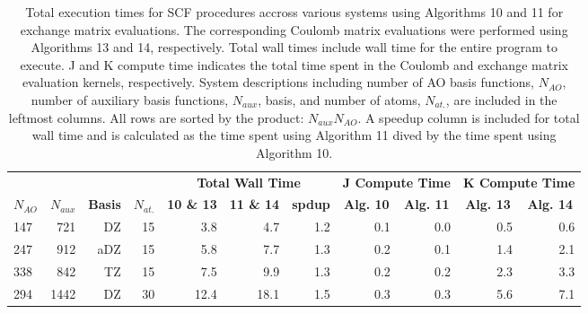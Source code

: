 \begingroup
\renewcommand{\arraystretch}{0.7}
\begin{table}[H]
\footnotesize
\centering
\renewcommand{\baselinestretch}{1}
\caption{Total execution times for SCF procedures accross various systems using Algorithms 10 and 11 for exchange matrix evaluations. 
The corresponding Coulomb matrix evaluations were performed using Algorithms 13 and 14, respectively. Total wall times include 
wall time for the entire program to execute. J and K compute time indicates the total time spent in the Coulomb and exchange matrix
evaluation kernels, respectively. System descriptions including number of AO basis functions, $N_{AO}$, number of auxiliary basis functions,
$N_{aux}$, basis, and number of atoms, $N_{at.}$, are included in the leftmost columns.  All rows are sorted by the product: $N_{aux}N_{AO}$.
A speedup column is included for total wall time and is calculated as the time spent using Algorithm 11 dived by the time spent using
Algorithm 10.
\label{tbl:practical_speedups}}
\begin{tabular}{lrrrrrrrrrr}
  \multicolumn{1}{c}{\textbf{}} 
& \multicolumn{1}{c}{\textbf{}} 
& \multicolumn{1}{c}{\textbf{}} 
& \multicolumn{1}{c}{\textbf{}} 
& \multicolumn{3}{c}{\textbf{Total Wall Time}}  
& \multicolumn{2}{c}{\textbf{J Compute Time}}  
& \multicolumn{2}{c}{\textbf{K Compute Time}} \\ 
\cline{5-7}
\cline{8-9}
\cline{10-11}
  \multicolumn{1}{c}{\textbf{$N_{AO}$}} 
& \multicolumn{1}{c}{\textbf{$N_{aux}$}} 
& \multicolumn{1}{c}{\textbf{Basis}} 
& \multicolumn{1}{c}{\textbf{$N_{at.}$}} 
& \multicolumn{1}{c}{\textbf{10 \& 13}} 
& \multicolumn{1}{c}{\textbf{11 \& 14}} 
& \multicolumn{1}{c}{\textbf{spdup}} 
& \multicolumn{1}{c}{\textbf{Alg. 10}} 
& \multicolumn{1}{c}{\textbf{Alg. 11}} 
& \multicolumn{1}{c}{\textbf{Alg. 13}} 
& \multicolumn{1}{c}{\textbf{Alg. 14}} \\ 
\hline
 147&  721&    DZ&    15&                 3.8 &                4.7&     1.2 &                0.1 &                0.0&                 0.5&                 0.6\\
 247&  912&   aDZ&    15&                 5.8 &                7.7&     1.3 &                0.2 &                0.1&                 1.4&                 2.1\\
 338&  842&    TZ&    15&                 7.5 &                9.9&     1.3 &                0.2 &                0.2&                 2.3&                 3.3\\
 294& 1442&    DZ&    30&                12.4 &               18.1&     1.5 &                0.3 &                0.3&                 5.6&                 7.1\\

\end{tabular}
\end{table}
